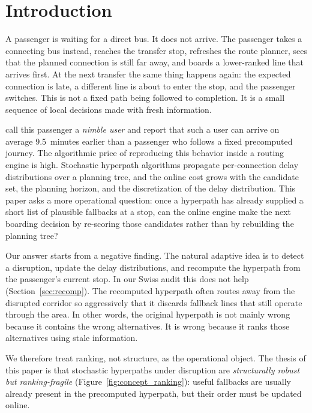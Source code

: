 \documentclass[opre,dblanonrev]{informs4}
\begin{document}
\section{Introduction}
\label{sec:intro}

A passenger is waiting for a direct bus. It does not arrive. The
passenger takes a connecting bus instead, reaches the transfer stop,
refreshes the route planner, sees that the planned connection is
still far away, and boards a lower-ranked line that arrives first.
At the next transfer the same thing happens again: the expected
connection is late, a different line is about to enter the stop, and
the passenger switches. This is not a fixed path being followed to
completion. It is a small sequence of local decisions made with
fresh information.

\citet{durner2024} call this passenger a \emph{nimble user} and
report that such a user can arrive on average 9.5~minutes earlier
than a passenger who follows a fixed precomputed journey. The
algorithmic price of reproducing this behavior inside a routing
engine is high. Stochastic hyperpath algorithms propagate
per-connection delay distributions over a planning tree, and the
online cost grows with the candidate set, the planning horizon, and
the discretization of the delay distribution. This paper asks a
more operational question: once a hyperpath has already supplied a
short list of plausible fallbacks at a stop, can the online engine
make the next boarding decision by re-scoring those candidates
rather than by rebuilding the planning tree?

Our answer starts from a negative finding. The natural adaptive
idea is to detect a disruption, update the delay distributions, and
recompute the hyperpath from the passenger's current stop. In our
Swiss audit this does not help (Section~\ref{sec:recomp}). The
recomputed hyperpath often routes away from the disrupted corridor
so aggressively that it discards fallback lines that still operate
through the area. In other words, the original hyperpath is not
mainly wrong because it contains the wrong alternatives. It is wrong
because it ranks those alternatives using stale information.

We therefore treat ranking, not structure, as the operational
object. The thesis of this paper is that stochastic hyperpaths under
disruption are \emph{structurally robust but ranking-fragile}
(Figure~\ref{fig:concept_ranking}): useful fallbacks are usually
already present in the precomputed hyperpath, but their order must
be updated online.
\end{document}

